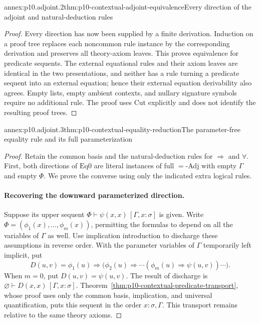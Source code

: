 \begin{annexitem}{annex:p10.adjoint.2}{thm:p10-contextual-adjoint-equivalence}{Every direction of the adjoint and natural-deduction rules}
\begin{proof}
Every direction has now been supplied by a finite derivation.
Induction on a proof tree replaces each noncommon rule instance
by the corresponding derivation and preserves all theory-axiom
leaves. This proves equivalence for predicate sequents.
The external equational rules and their axiom leaves are identical
in the two presentations, and neither has a rule turning a
predicate sequent into an external equation; hence their external
equation derivability also agrees.
Empty lists, empty ambient contexts, and nullary signature symbols
require no additional rule. The proof uses Cut explicitly and
does not identify the resulting proof trees.
\end{proof}
\end{annexitem}

\begin{annexitem}{annex:p10.adjoint.3}{thm:p10-contextual-equality-reduction}{The parameter-free equality rule and its full parameterization}
\begin{proof}
Retain the common basis and the natural-deduction rules for
\(\Rightarrow\) and \(\forall\).
First, both directions of \(\mathrm{Eq0}\) are literal instances
of full \(=\)-Adj with empty \(\Gamma\) and empty \(\Phi\).
We prove the converse using only the indicated extra logical rules.

\paragraph{Recovering the downward parameterized direction.}
Suppose its upper sequent
\(\Phi\vdash\psi(x,x)\,[\Gamma,x:\sigma]\) is given.
Write \(\Phi=(\phi_1(x),\ldots,\phi_m(x))\), permitting
the formulas to depend on all the variables of \(\Gamma\) as well.
Use implication introduction to discharge these assumptions in
reverse order. With the parameter variables of \(\Gamma\)
temporarily left implicit, put
\[
 D(u,v)=\phi_1(u)\Rightarrow
       \bigl(\phi_2(u)\Rightarrow\cdots
          (\phi_m(u)\Rightarrow\psi(u,v))\cdots\bigr).
\]
When \(m=0\), put \(D(u,v)=\psi(u,v)\).
The result of discharge is
\(\varnothing\vdash D(x,x)\,[\Gamma,x:\sigma]\).
Theorem~\ref{thm:p10-contextual-predicate-transport}, whose proof
uses only the common basis, implication, and universal
quantification, puts this sequent in the order \(x:\sigma,\Gamma\).
This transport remains relative to the same theory axioms.


\end{proof}
\end{annexitem}
